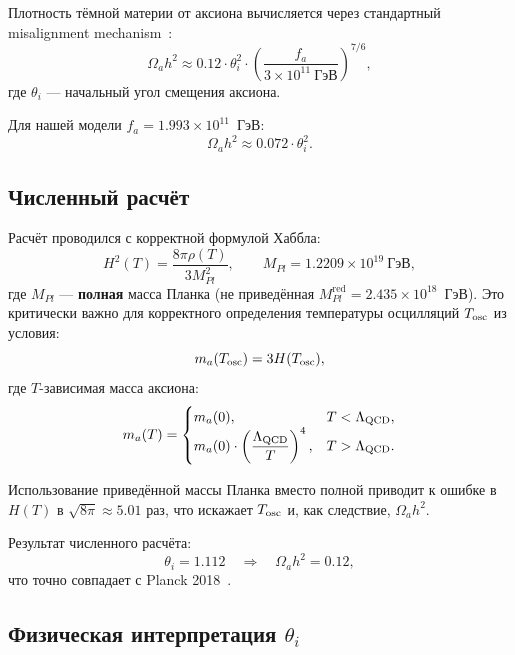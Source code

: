 \documentclass[12pt,a4paper]{article}
\numberwithin{equation}{section}
\begin{document}
Плотность тёмной материи от аксиона вычисляется через 
стандартный misalignment mechanism~\cite{Preskill1983}:
\begin{equation}
\Omega_a h^2 \approx 0.12 \cdot \theta_i^2 \cdot 
\left(\frac{f_a}{3\times 10^{11}~\text{ГэВ}}\right)^{7/6},
\end{equation}
где $\theta_i$ --- начальный угол смещения аксиона.

Для нашей модели $f_a = 1.993\times 10^{11}$~ГэВ:
\begin{equation}
\Omega_a h^2 \approx 0.072 \cdot \theta_i^2.
\end{equation}

\subsection{Численный расчёт}

Расчёт проводился с корректной формулой Хаббла:
\begin{equation}
H^2(T) = \frac{8\pi \rho(T)}{3 M_{Pl}^2}, \qquad 
M_{Pl} = 1.2209\times 10^{19}~\text{ГэВ},
\end{equation}
где $M_{Pl}$ --- \textbf{полная} масса Планка (не приведённая 
$M_{Pl}^{\text{red}} = 2.435\times 10^{18}$~ГэВ). Это критически 
важно для корректного определения температуры осцилляций 
$T_{\rm osc}$ из условия:
\begin{equation}
m_a(T_{\rm osc}) = 3 H(T_{\rm osc}),
\end{equation}
где $T$-зависимая масса аксиона:
\begin{equation}
m_a(T) = \begin{cases}
m_a(0), & T < \Lambda_{\rm QCD}, \\
m_a(0) \cdot \left(\dfrac{\Lambda_{\rm QCD}}{T}\right)^4, & T > \Lambda_{\rm QCD}.
\end{cases}
\end{equation}

Использование приведённой массы Планка вместо полной приводит 
к ошибке в $H(T)$ в $\sqrt{8\pi} \approx 5.01$ раз, что искажает 
$T_{\rm osc}$ и, как следствие, $\Omega_a h^2$.

Результат численного расчёта:
\begin{equation}
\theta_i = 1.112 \quad \Rightarrow \quad \Omega_a h^2 = 0.12,
\end{equation}
что точно совпадает с Planck 2018~\cite{Planck2018}.

\subsection{Физическая интерпретация $\theta_i$}
\end{document}
